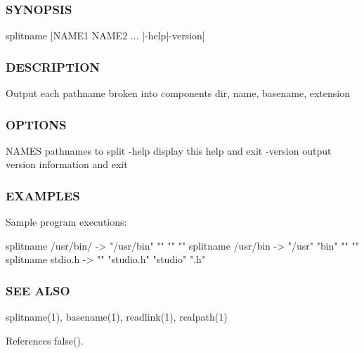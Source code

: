 \subsubsection*{S\+Y\+N\+O\+P\+S\+IS}

\begin{DoxyVerb}splitname [NAME1 NAME2 ... |-help|-version]
\end{DoxyVerb}


\subsubsection*{D\+E\+S\+C\+R\+I\+P\+T\+I\+ON}

Output each pathname broken into components dir, name, basename, extension

\subsubsection*{O\+P\+T\+I\+O\+NS}

N\+A\+M\+ES pathnames to split -\/help display this help and exit -\/version output version information and exit

\subsubsection*{E\+X\+A\+M\+P\+L\+ES}

\begin{DoxyVerb}Sample program executions:

  splitname /usr/bin/          -> "/usr/bin" "" "" ""
  splitname /usr/bin           -> "/usr" "bin" "" ""
  splitname stdio.h            -> "" "studio.h" "studio" ".h"
\end{DoxyVerb}


\subsubsection*{S\+EE A\+L\+SO}

splitname(1), basename(1), readlink(1), realpath(1) 

References false().

